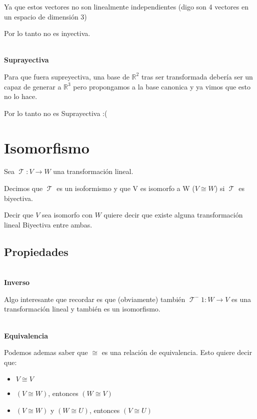 \documentclass[12pt]{report}                                %
\DeclareMathOperator \LinealTransformation {\mathcal{T}}
\begin{document}
            Ya que estos vectores no son linealmente independientes (digo son 4 vectores en un espacio de dimensión 3)

            Por lo tanto no es inyectiva.

            \textbf{\\Suprayectiva}

            Para que fuera supreyectiva, una base de $\mathbb{R}^2$ tras ser transformada debería ser un capaz de
            generar a $\mathbb{R}^3$ pero propongamos a la base canonica y ya vimos que esto no lo hace.

            Por lo tanto no es Suprayectiva :(


    \clearpage
    \section{Isomorfismo}
        Sea $\LinealTransformation : V \to W $ una transformación lineal.

        Decimos que $\LinealTransformation$ es un isoformismo y que V es isomorfo a W 
        ($V \cong W$) si $\LinealTransformation$ es biyectiva.

        Decir que $V$ sea isomorfo con $W$ quiere decir que existe alguna transformación
        lineal Biyectiva entre ambas.

        \subsection{Propiedades}

            \textbf{\\Inverso}

            Algo interesante que recordar es que (obviamente) también
            $\LinealTransformation^-1 : W \to V $ es una transformación lineal
            y también es un isomorfismo.

            \textbf{\\Equivalencia}

            Podemos ademas saber que $\cong$ es una relación de equivalencia.
            Esto quiere decir que:

            \begin{itemize}
                \item $V \cong V$
                \item $(V \cong W)$, entonces $(W \cong V)$
                \item $(V \cong W)$ y $(W \cong U)$, entonces $(V \cong U)$
            \end{itemize}
\end{document}
